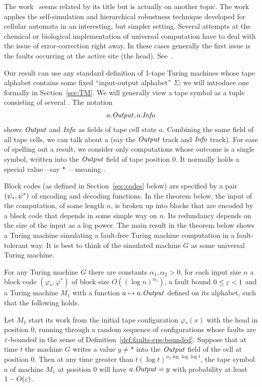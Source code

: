 \documentclass[11pt]{memoir}
\theoremstyle{definition} %
\renewcommand{\le}{\leq}
\newcommand{\fld}[1]{\ensuremath{\textit{#1\/}}}
\def\G{G} %
\newcommand{\Info}{\fld{Info}}
\newcommand{\Output}{\fld{Output}}
\begin{document}
The work~\cite{AsarinCollins2005} seems related by its title 
but is actually on another topic.
The work~\cite{DurandRomashShenTiling12} applies the self-simulation and
hierarchical robustness technique developed for cellular automata in an interesting, but
simpler setting.
Several attempts at the chemical or
biological implementation of universal computation have to deal with
the issue of error-correction right away.
In these cases generally the first issue is the faults occurring at the active site (the head).
See~\cite{BennettThermodynComp1982,QianSoloveichikWinfree2011}.

Our result can use any standard definition of 1-tape Turing machines whose tape alphabet
contains some fixed ``input-output alphabet'' \( \Sigma \); we will
introduce one formally in Section~\ref{sec:TM}.
We will generally view a tape symbol as a tuple consisting of several .
The notation
\begin{align*}
   a.\Output, a.\Info
 \end{align*}
 shows \( \Output \) and \( \Info \) as fields of tape cell state \( a \).
Combining the same field of all tape cells, we can talk about a 
(say the \( \Output \) track and \( \Info \) track).
For ease of spelling out a result, we consider only computations whose outcome
is a single symbol, written into the \( \Output \) field of tape position 0.
It normally holds a special value---say \( * \) ---meaning .

Block codes (as defined in Section~\ref{sec:codes} below) are specified by a
pair \( (\psi_{*},\psi^{*}) \) of encoding and decoding functions.
In the theorem below, the input of the computation, of some length \( n \), is broken up into blocks
that are encoded by a block code that depends in some simple way on \( n \).
Its redundancy depends on the size of the input as a log power.
The main result in the theorem below shows a Turing machine simulating a fault-free
Turing machine computation in a fault-tolerant way.
It is best to think of the simulated machine \( G \) as some universal Turing machine.

\begin{theorem}\label{thm:main}
  For any Turing machine \( \G \) there are constants \( \alpha_{1},\alpha_{2}>0 \),
  for each input size \( n \) a
  block code \( (\varphi_{*}, \varphi^{*}) \) of block size \( O((\log n)^{\alpha_{1}}) \),
a fault bound  \( 0\le\eps <1 \) and a Turing machine \( M_{1} \) with a 
function \( a\mapsto a.\Output \) defined on its alphabet,
such that the following holds.

Let \( M_{1} \) start its work from the initial tape configuration \( \varphi_{*}(x) \) with the head
in position 0,
running through a random sequence of configurations whose faults are \( \varepsilon \)-bounded in the sense
of Definition~\ref{def:faults-eps-bounded}.
Suppose that at time \( t \) the machine \( \G \) writes a value \( y\ne * \) 
into the \( \Output \) field of the cell at position 0.
Then at any time greater than \(    t(\log t)^{\alpha_{2}\log\log\log t} \),
the tape symbol \( a \) of machine \( M_{1} \) at position 0
 will have \( a.\Output= y \) with probability at least \( 1 - O(\varepsilon) \).
\end{theorem}
\end{document}
